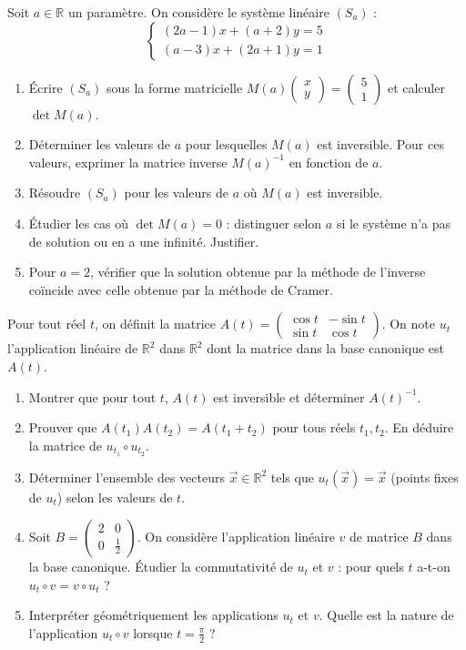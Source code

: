 \documentclass[11pt]{article}
\begin{document}
\begin{exercice}
Soit $a\in\mathbb{R}$ un paramètre. On considère le système linéaire $(S_a)$ :
\[
\begin{cases}
(2a-1)x + (a+2)y = 5\\
(a-3)x + (2a+1)y = 1
\end{cases}
\]
\begin{enumerate}
\item Écrire $(S_a)$ sous la forme matricielle $M(a)\begin{pmatrix}x\\y\end{pmatrix}=\begin{pmatrix}5\\1\end{pmatrix}$ et calculer $\det M(a)$.
\item Déterminer les valeurs de $a$ pour lesquelles $M(a)$ est inversible. Pour ces valeurs, exprimer la matrice inverse $M(a)^{-1}$ en fonction de $a$.
\item Résoudre $(S_a)$ pour les valeurs de $a$ où $M(a)$ est inversible.
\item Étudier les cas où $\det M(a)=0$ : distinguer selon $a$ si le système n'a pas de solution ou en a une infinité. Justifier.
\item Pour $a=2$, vérifier que la solution obtenue par la méthode de l'inverse coïncide avec celle obtenue par la méthode de Cramer.
\end{enumerate}
\end{exercice}

\begin{exercice}
Pour tout réel $t$, on définit la matrice $A(t)=\begin{pmatrix}\cos t & -\sin t \\ \sin t & \cos t\end{pmatrix}$.
On note $u_t$ l'application linéaire de $\mathbb{R}^2$ dans $\mathbb{R}^2$ dont la matrice dans la base canonique est $A(t)$.
\begin{enumerate}
\item Montrer que pour tout $t$, $A(t)$ est inversible et déterminer $A(t)^{-1}$.
\item Prouver que $A(t_1)A(t_2)=A(t_1+t_2)$ pour tous réels $t_1,t_2$. En déduire la matrice de $u_{t_1}\circ u_{t_2}$.
\item Déterminer l'ensemble des vecteurs $\vec{x}\in\mathbb{R}^2$ tels que $u_t(\vec{x})=\vec{x}$ (points fixes de $u_t$) selon les valeurs de $t$.
\item Soit $B=\begin{pmatrix}2 & 0 \\ 0 & \frac12\end{pmatrix}$. On considère l'application linéaire $v$ de matrice $B$ dans la base canonique. Étudier la commutativité de $u_t$ et $v$ : pour quels $t$ a-t-on $u_t\circ v = v\circ u_t$ ?
\item Interpréter géométriquement les applications $u_t$ et $v$. Quelle est la nature de l'application $u_t\circ v$ lorsque $t=\frac{\pi}{2}$ ?
\end{enumerate}
\end{exercice}
\end{document}
